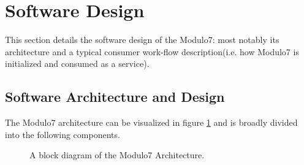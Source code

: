 \documentclass{article}
\begin{document}
\section{Software Design}\label{sec:architecture}

This section details the software design of the Modulo7: most notably its architecture and a typical consumer work-flow description(i.e. how Modulo7 is initialized and consumed as a service). 

\subsection{Software Architecture and Design}

The Modulo7 architecture can be visualized in figure \ref{fig:architecture} and is broadly divided into the following components. 

\begin{figure}[h]
\begin{center}
{}
 \caption{A block diagram of the Modulo7 Architecture.}
 \label{fig:architecture}
\end{center}
\end{figure}
\end{document}
